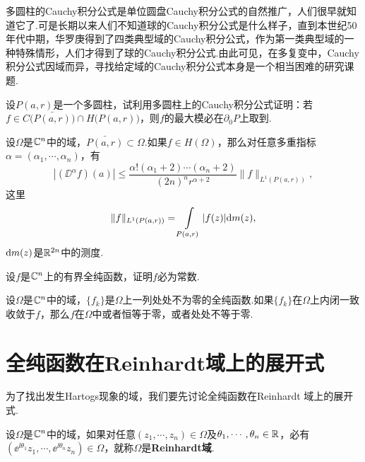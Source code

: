多圆柱的Cauchy积分公式是单位圆盘Cauchy积分公式的自然推广，人们很早就知道它了.可是长期以来人们不知道球的Cauchy积分公式是什么样子，直到本世纪50年代中期，华罗庚得到了四类典型域的Cauchy积分公式，作为第一类典型域的一种特殊情形，人们才得到了球的Cauchy积分公式.由此可见，在多复变中，Cauchy积分公式因域而异，寻找给定域的Cauchy积分公式本身是一个相当困难的研究课题.
\begin{xiti}
\item 设$P(a,r)$是一个多圆柱，试利用多圆柱上的Cauchy积分公式证明：若$f\in C\big(\bar{P(a,r)}\big)\cap H\big(P(a,r)\big)$，则$f$的最大模必在$\partial_0P$上取到.
\item 设$\Omega$是$\mathbb C^n$中的域，$\bar{P(a,r)}\subset\Omega$.如果$f\in H(\Omega)$，那么对任意多重指标$\alpha=(\alpha_1,\cdots,\alpha_n)$，有
    \[|(\DD^\alpha f)(a)|\le\frac{\alpha!(\alpha_1+2)\cdots(\alpha_n+2)}{(2n)^nr^{\alpha+2}}\|f\|
    _{L^1(P(a,r))},\]
这里
\[\|f\|_{L^1(P(a,r))}=\int\limits_{P(a,r)}|f(z)|\textrm dm(z),\]
$\textrm dm(z)$是$\mathbb R^{2n}$中的测度.
\item 设$f$是$\mathbb C^n$上的有界全纯函数，证明$f$必为常数.
\item 设$\Omega$是$\mathbb C^n$中的域，$\{f_k\}$是$\Omega$上一列处处不为零的全纯函数.如果$\{f_k\}$在$\Omega$上内闭一致收敛于$f$，那么$f$在$\Omega$中或者恒等于零，或者处处不等于零.
\end{xiti}

\section{全纯函数在Reinhardt域上的展开式\label{sec9.2}}
为了找出发生Hartogs现象的域，我们要先讨论全纯函数在Reinhardt 域上的展开式.
\begin{definition}\label{def9.3.1}
设$\Omega$是$\mathbb C^n$中的域，如果对任意$(z_1,\cdots,z_n)\in\Omega$及$\theta_1,\cdots,\theta_n\in\mathbb R$，必有$(\ee^{\ii\theta_1}z_1,\cdots,\ee^{\ii\theta_n}z_n)\in\Omega$，就称$\Omega$是\textbf{Reinhardt域}.
\end{definition}


